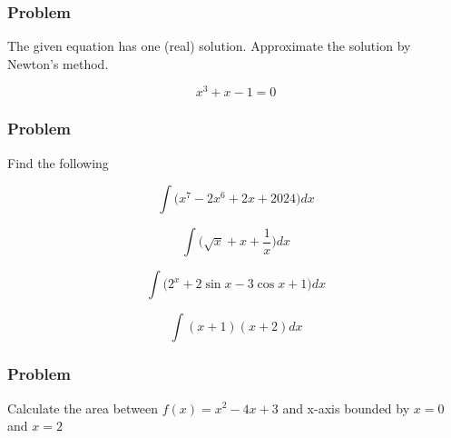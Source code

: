 \documentclass[
  letterpaper,
  DIV=11,
  numbers=noendperiod]{scrartcl}
\begin{document}
\subsubsection{Problem}\label{problem-10}

The given equation has one (real) solution. Approximate the solution by
Newton's method.

\[x^3 + x - 1  = 0\]

\subsubsection{Problem}\label{problem-11}

Find the following

\[\int \bigg(x^7 - 2x^6 + 2x + 2024 \bigg) dx\]

\[\int \bigg( \sqrt x + x + \frac{1}{x}\bigg) dx\]

\[\int \bigg( 2^x + 2\sin x  - 3 \cos x + 1\bigg) dx\]

\[\int ( x  + 1)(x+2 ) dx\]

\subsubsection{Problem}\label{problem-12}

Calculate the area between \(f(x) = x^2 -4x + 3\) and x-axis bounded by
\(x = 0\) and \(x = 2\)
\end{document}

